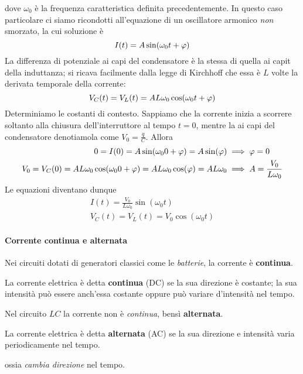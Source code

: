dove $\omega_0$ è la frequenza caratteristica definita precedentemente. In questo caso particolare ci siamo ricondotti all'equazione di un oscillatore armonico \textit{non} smorzato, la cui soluzione è
\begin{equation}
	I(t)=A\sin(\omega_0 t+\oldphi)
\end{equation}
La differenza di potenziale ai capi del condensatore è la stessa di quella ai capit della induttanza; si ricava facilmente dalla legge di Kirchhoff che essa è $L$ volte la derivata temporale della corrente:
\begin{equation*}
	V_C(t)=V_L(t)=AL\omega_0\cos(\omega_0 t+\oldphi)
\end{equation*}
Determiniamo le costanti di contesto. Sappiamo che la corrente inizia a scorrere soltanto alla chiusura dell'interruttore al tempo $t=0$, mentre la \ddp ai capi del condensatore denotiamola come $V_0=\frac{q}{C}$. Allora
\begin{align*}
	0=I(0)=A\sin(\omega_0 0+\oldphi)=A\sin(\oldphi)&\implies \oldphi =0\\
	V_0=V_C(0)=AL\omega_0\cos(\omega_0 0+\oldphi)=AL\omega_0\cos(\oldphi)=AL\omega_0&\implies A=\frac{V_0}{L\omega_0}
\end{align*}
Le equazioni diventano dunque
\begin{gather}
	I(t)=\frac{V_0}{L\omega_0}\sin(\omega_0 t)\\
	V_C(t)=V_L(t)=V_0\cos(\omega_0 t)
\end{gather}
\paragraph{Corrente continua e alternata}
Nei circuiti dotati di generatori classici come le \textit{batterie}, la corrente è \textbf{continua}.
\begin{define}
	La corrente elettrica è detta \textbf{continua} (DC) se la sua direzione è costante; la sua intensità può essere anch'essa costante oppure può variare d'intensità nel tempo. 
\end{define} %
Nel circuito $LC$ la corrente non è \textit{continua}, bensì \textbf{alternata}.
\begin{define}
	La corrente elettrica è detta \textbf{alternata} (AC) se la sua direzione e intensità varia periodicamente nel tempo.
\end{define} 
ossia \textit{cambia direzione} nel tempo.

